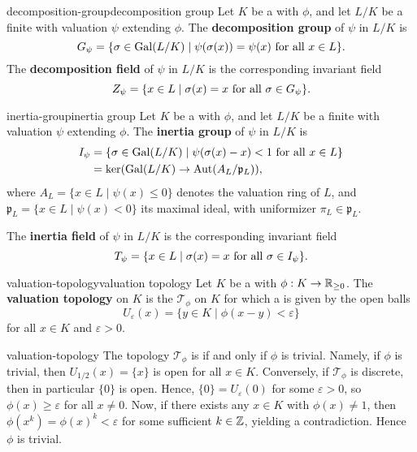 \begin{topic}{decomposition-group}{decomposition group}
    Let $K$ be a  with  $\phi$, and let $L/K$ be a finite  with valuation $\psi$ extending $\phi$. The \textbf{decomposition group} of $\psi$ in $L/K$ is
    \[ G_\psi = \{ \sigma \in \operatorname{Gal}(L/K) \mid \psi(\sigma(x)) = \psi(x) \textup{ for all } x \in L \} . \]
    The \textbf{decomposition field} of $\psi$ in $L/K$ is the corresponding invariant field
    \[ Z_\psi = \{ x \in L \mid \sigma(x) = x \textup{ for all } \sigma \in G_\psi \} . \]
\end{topic}

\begin{topic}{inertia-group}{inertia group}
    Let $K$ be a  with  $\phi$, and let $L/K$ be a finite  with valuation $\psi$ extending $\phi$. The \textbf{inertia group} of $\psi$ in $L/K$ is
    \[ \begin{aligned}
        I_\psi &= \{ \sigma \in \operatorname{Gal}(L/K) \mid \psi(\sigma(x) - x) < 1 \textup{ for all } x \in L \} \\
        &= \ker (\operatorname{Gal}(L/K) \to \operatorname{Aut}(A_L / \mathfrak{p}_L)) ,
    \end{aligned} \]
    where $A_L = \{ x \in L \mid \psi(x) \le 0 \}$ denotes the valuation ring of $L$, and $\mathfrak{p}_L = \{ x \in L \mid \psi(x) < 0 \}$ its maximal ideal, with uniformizer $\pi_L \in \mathfrak{p}_L$.
    
    The \textbf{inertia field} of $\psi$ in $L/K$ is the corresponding invariant field
    \[ T_\psi = \{ x \in L \mid \sigma(x) = x \textup{ for all } \sigma \in I_\psi \} . \]
\end{topic}

\begin{topic}{valuation-topology}{valuation topology}
    Let $K$ be a  with  $\phi : K \to \mathbb{R}_{\ge 0}$. The \textbf{valuation topology} on $K$ is the  $\mathcal{T}_\phi$ on $K$ for which a  is given by the open balls
    \[ U_\varepsilon(x) = \{ y \in K \mid \phi(x - y) < \varepsilon \} \]
    for all $x \in K$ and $\varepsilon > 0$.
\end{topic}

\begin{example}{valuation-topology}
    The topology $\mathcal{T}_\phi$ is  if and only if $\phi$ is trivial. Namely, if $\phi$ is trivial, then $U_{1/2}(x) = \{ x \}$ is open for all $x \in K$. Conversely, if $\mathcal{T}_\phi$ is discrete, then in particular $\{ 0 \}$ is open. Hence, $\{ 0 \} = U_\varepsilon(0)$ for some $\varepsilon > 0$, so $\phi(x) \ge \varepsilon$ for all $x \ne 0$. Now, if there exists any $x \in K$ with $\phi(x) \ne 1$, then $\phi(x^k) = \phi(x)^k < \varepsilon$ for some sufficient $k \in \mathbb{Z}$, yielding a contradiction. Hence $\phi$ is trivial.
\end{example}

